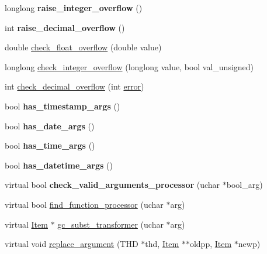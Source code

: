 \begin{DoxyCompactItemize}
\mbox{\label{classItem__func_a066a0372454d5cf6dd79e126e3503edc}} 
longlong {\bfseries raise\+\_\+integer\+\_\+overflow} ()
\item 
\mbox{\label{classItem__func_a1087055ef2edc72ca6123e3f4f2cb526}} 
int {\bfseries raise\+\_\+decimal\+\_\+overflow} ()
\item 
double \mbox{\hyperlink{classItem__func_ad5e212313e17d9373e339d59e903f05d}{check\+\_\+float\+\_\+overflow}} (double value)
\item 
longlong \mbox{\hyperlink{classItem__func_a47683db1fe024c786d27ca475c916c00}{check\+\_\+integer\+\_\+overflow}} (longlong value, bool val\+\_\+unsigned)
\item 
int \mbox{\hyperlink{classItem__func_a09947594d7f70394fad68d8d1341c0d0}{check\+\_\+decimal\+\_\+overflow}} (int \mbox{\hyperlink{classParse__tree__node_a3e43a52bddede2f3ffd34257a8863c85}{error}})
\item 
\mbox{\label{classItem__func_a710157d69702cf532abd1753d9cc3241}} 
bool {\bfseries has\+\_\+timestamp\+\_\+args} ()
\item 
\mbox{\label{classItem__func_aa6107bcf6ffdc5f00192499738f2fa52}} 
bool {\bfseries has\+\_\+date\+\_\+args} ()
\item 
\mbox{\label{classItem__func_ab51f02c08935c246c51733492cac0cb4}} 
bool {\bfseries has\+\_\+time\+\_\+args} ()
\item 
\mbox{\label{classItem__func_ad4e7dc6f8b94694d42bdc08cf69e159e}} 
bool {\bfseries has\+\_\+datetime\+\_\+args} ()
\item 
\mbox{\label{classItem__func_a60557999efcf2203a62179ab51ed9a46}} 
virtual bool {\bfseries check\+\_\+valid\+\_\+arguments\+\_\+processor} (uchar $\ast$bool\+\_\+arg)
\item 
virtual bool \mbox{\hyperlink{classItem__func_a0aeb033ca165677743782518419b71ac}{find\+\_\+function\+\_\+processor}} (uchar $\ast$arg)
\item 
virtual \mbox{\hyperlink{classItem}{Item}} $\ast$ \mbox{\hyperlink{classItem__func_acac46454222156dbb8336cc709c6cf41}{gc\+\_\+subst\+\_\+transformer}} (uchar $\ast$arg)
\item 
virtual void \mbox{\hyperlink{classItem__func_a057cee4e4645ad681094796d24236b62}{replace\+\_\+argument}} (T\+HD $\ast$thd, \mbox{\hyperlink{classItem}{Item}} $\ast$$\ast$oldpp, \mbox{\hyperlink{classItem}{Item}} $\ast$newp)
\end{DoxyCompactItemize}
